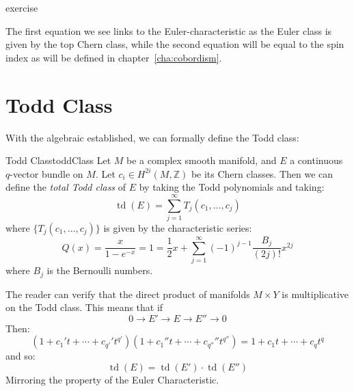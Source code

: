 \documentclass{ut-thesis}
\newenvironment{Proof}[1][]
  {\begin{ProofTcb}[#1]}
  {\end{ProofTcb}}
\newcommand{\Z}{{\mathbb{Z}}}
\newcommand{\td}{{\operatorname{td}}}
\begin{document}
\begin{Proof}
  exercise
\end{Proof}
The first equation we see links to the Euler-characteristic as the Euler class is given by the top Chern class,
while the second equation will be equal to the spin index as will be defined in chapter~\ref{cha:cobordism}.
%
%
%
%

\section{Todd Class}

With the algebraic established, we can formally define the Todd class:

\begin{defn}{Todd Class}{toddClass}
  Let $M$ be a complex smooth manifold, and $E$ a continuous $q$-vector bundle on $M$. Let $c_i \in H^{2i}(M, \Z)$
  be its Chern classes. Then we can define the \emph{total Todd class} of $E$ by taking the Todd polynomials
  and taking:
  \[
    \td(E) = \sum_{j=1}^\infty T_j(c_1, ..., c_j)
  \]
  where $\{T_j(c_1, ..., c_j)\}$ is given by the characteristic series:
  \[
    Q(x) = \frac{x}{1-e^{-x}} = 1 = \frac{1}{2}x + \sum_{j=1}^\infty (-1)^{j-1} \frac{B_j}{(2j)!}x^{2j}
  \]
  where $B_j$ is the Bernoulli numbers.
\end{defn}
The reader can verify that the direct product of manifolds $M\times Y$ is multiplicative on the Todd class.
This means that if
\[
  0 \to E' \to E \to E'' \to 0
\]
Then:
\[
  (1 + c_1't + \cdots + c_{q'}'t^{q'})(1 + c_1''t + \cdots + c_{q''}''t^{q''}) =  1 + c_1t + \cdots + c_{q}t^{q}
\]
and so:
\[
  \td(E) = \td(E')\cdot \td(E'')
\]
Mirroring the property of the Euler Characteristic.
\end{document}
